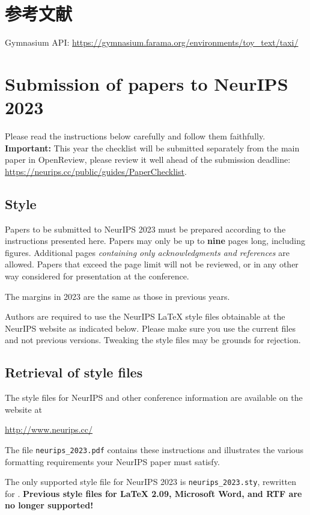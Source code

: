 \documentclass{article}
\begin{document}
\begin{CJK}{UTF8}{gbsn}
\section{参考文献}
Gymnasium API: \url{https://gymnasium.farama.org/environments/toy_text/taxi/}

\section{Submission of papers to NeurIPS 2023}


Please read the instructions below carefully and follow them faithfully. \textbf{Important:} This year the checklist will be submitted separately from the main paper in OpenReview, please review it well ahead of the submission deadline: \url{https://neurips.cc/public/guides/PaperChecklist}.


\subsection{Style}


Papers to be submitted to NeurIPS 2023 must be prepared according to the
instructions presented here. Papers may only be up to {\bf nine} pages long,
including figures. Additional pages \emph{containing only acknowledgments and
references} are allowed. Papers that exceed the page limit will not be
reviewed, or in any other way considered for presentation at the conference.


The margins in 2023 are the same as those in previous years.


Authors are required to use the NeurIPS \LaTeX{} style files obtainable at the
NeurIPS website as indicated below. Please make sure you use the current files
and not previous versions. Tweaking the style files may be grounds for
rejection.


\subsection{Retrieval of style files}


The style files for NeurIPS and other conference information are available on
the website at
\begin{center}
  \url{http://www.neurips.cc/}
\end{center}
The file \verb+neurips_2023.pdf+ contains these instructions and illustrates the
various formatting requirements your NeurIPS paper must satisfy.


The only supported style file for NeurIPS 2023 is \verb+neurips_2023.sty+,
rewritten for \LaTeXe{}.  \textbf{Previous style files for \LaTeX{} 2.09,
  Microsoft Word, and RTF are no longer supported!}



\end{CJK}
\end{document}
